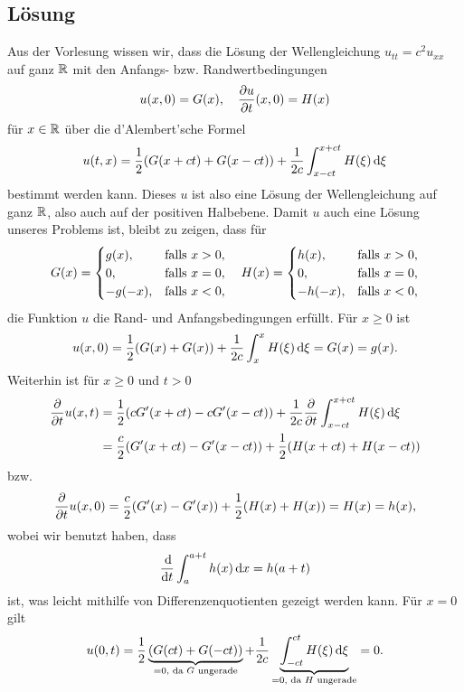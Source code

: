 \documentclass{exercise}
\begin{document}
    \subsection*{Lösung}
    Aus der Vorlesung wissen wir, dass die Lösung der Wellengleichung \(u_{tt} = c^2 u_{xx}\) auf ganz \(\mathbb{R}\) mit den Anfangs- bzw. Randwertbedingungen
    \[
        u\parentheses*{x, 0} = G\parentheses*{x}, \quad \frac{\partial u}{\partial t}\parentheses*{x, 0} = H\parentheses*{x}
    \]
    für \(x \in \mathbb{R}\) über die d'Alembert'sche Formel
    \[
        u\parentheses*{t, x} = \frac{1}{2}\parentheses*{G\parentheses*{x + ct} + G\parentheses*{x - ct}} + \frac{1}{2c}\int_{x - ct}^{x + ct}H\parentheses*{\xi}\d\xi
    \]
    bestimmt werden kann.
    Dieses \(u\) ist also eine Lösung der Wellengleichung auf ganz \(\mathbb{R}\), also auch auf der positiven Halbebene.
    Damit \(u\) auch eine Lösung unseres Problems ist, bleibt zu zeigen, dass für
    \[
        G\parentheses*{x} = \begin{cases}
            g\parentheses*{x}, & \text{falls }x > 0,\\
            0, & \text{falls }x = 0,\\
            -g\parentheses*{-x}, & \text{falls }x < 0,
        \end{cases} \quad H\parentheses*{x} = \begin{cases}
            h\parentheses*{x}, & \text{falls }x > 0,\\
            0, & \text{falls }x = 0,\\
            -h\parentheses*{-x}, & \text{falls }x < 0,
        \end{cases}
    \]
    die Funktion \(u\) die Rand- und Anfangsbedingungen erfüllt.
    Für \(x \ge 0\) ist
    \[
        u\parentheses*{x, 0} = \frac{1}{2}\parentheses*{G\parentheses*{x} + G\parentheses*{x}} + \frac{1}{2c}\int_x^x H\parentheses*{\xi}\d\xi = G\parentheses*{x} = g\parentheses*{x}.
    \]
    Weiterhin ist für \(x \ge 0\) und \(t > 0\)
    \begin{align*}
        \frac{\partial}{\partial t}u\parentheses*{x, t} &= \frac{1}{2}\parentheses*{cG'\parentheses*{x + ct} - cG'\parentheses*{x - ct}} + \frac{1}{2c}\frac{\partial}{\partial t}\int_{x - ct}^{x + ct}H\parentheses*{\xi}\d\xi\\
        &= \frac{c}{2}\parentheses*{G'\parentheses*{x + ct} - G'\parentheses*{x - ct}} + \frac{1}{2}\parentheses*{H\parentheses*{x + ct} + H\parentheses*{x - ct}}
    \end{align*}
    bzw.
    \[
        \frac{\partial}{\partial t}u\parentheses*{x, 0} = \frac{c}{2}\parentheses*{G'\parentheses*{x} - G'\parentheses*{x}} + \frac{1}{2}\parentheses*{H\parentheses*{x} + H\parentheses*{x}} = H\parentheses*{x} = h\parentheses*{x},
    \]
    wobei wir benutzt haben, dass
    \[
        \frac{\d}{\d t}\int_a^{a + t}h\parentheses*{x}\d x = h\parentheses*{a + t}
    \]
    ist, was leicht mithilfe von Differenzenquotienten gezeigt werden kann.
    Für \(x = 0\) gilt
    \[
        u\parentheses*{0, t} = \frac{1}{2}\underbrace{\parentheses*{G\parentheses*{ct} + G\parentheses*{-ct}}}_{= 0\text{, da }G\text{ ungerade}} + \frac{1}{2c}\underbrace{\int_{-ct}^{ct}H\parentheses*{\xi}\d\xi}_{= 0\text{, da }H\text{ ungerade}} = 0.
    \]
\end{document}
